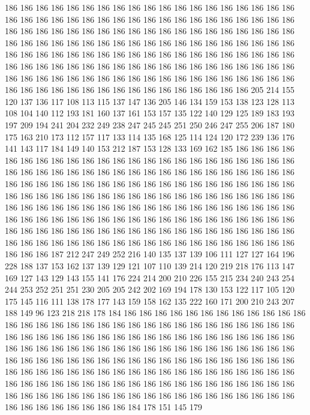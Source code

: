 186 186 186 186 186 186 186 186 186 186 186 186 186 186 186 186 186 186 186 186
186 186 186 186 186 186 186 186 186 186 186 186 186 186 186 186 186 186 186 186
186 186 186 186 186 186 186 186 186 186 186 186 186 186 186 186 186 186 186 186
186 186 186 186 186 186 186 186 186 186 186 186 186 186 186 186 186 186 186 186
186 186 186 186 186 186 186 186 186 186 186 186 186 186 186 186 186 186 186 186
186 186 186 186 186 186 186 186 186 186 186 186 186 186 186 186 186 186 186 186
186 186 186 186 186 186 186 186 186 186 186 186 186 186 186 186 186 186 186 186
186 186 186 186 186 186 186 186 186 205 214 155 120 137 136 117 108 113 115 137
147 136 205 146 134 159 153 138 123 128 113 108 104 140 112 193 181 160 137 161
153 157 135 122 140 129 125 189 183 193 197 209 194 241 204 232 249 238 247 245
245 251 250 246 247 255 206 187 180 175 163 210 173 112 157 117 133 114 135 168
125 114 124 120 172 239 136 176 141 143 117 184 149 140 153 212 187 153 128 133
169 162 185 186 186 186 186 186 186 186 186 186 186 186 186 186 186 186 186 186
186 186 186 186 186 186 186 186 186 186 186 186 186 186 186 186 186 186 186 186
186 186 186 186 186 186 186 186 186 186 186 186 186 186 186 186 186 186 186 186
186 186 186 186 186 186 186 186 186 186 186 186 186 186 186 186 186 186 186 186
186 186 186 186 186 186 186 186 186 186 186 186 186 186 186 186 186 186 186 186
186 186 186 186 186 186 186 186 186 186 186 186 186 186 186 186 186 186 186 186
186 186 186 186 186 186 186 186 186 186 186 186 186 186 186 186 186 186 186 186
186 186 186 186 186 186 186 186 186 186 186 186 186 186 186 186 186 186 186 186
186 186 187 212 247 249 252 216 140 135 137 139 106 111 127 127 164 196 228 188
137 153 162 137 139 129 121 107 110 139 214 120 219 218 176 113 147 169 127 143
129 143 155 141 176 224 214 200 210 226 155 215 234 240 243 254 244 253 252 251
251 230 205 205 242 202 169 194 178 130 153 122 117 105 120 175 145 116 111 138
178 177 143 159 158 162 135 222 160 171 200 210 243 207 188 149 96 123 218 218
178 184 186 186 186 186 186 186 186 186 186 186 186 186 186 186 186 186 186 186
186 186 186 186 186 186 186 186 186 186 186 186 186 186 186 186 186 186 186 186
186 186 186 186 186 186 186 186 186 186 186 186 186 186 186 186 186 186 186 186
186 186 186 186 186 186 186 186 186 186 186 186 186 186 186 186 186 186 186 186
186 186 186 186 186 186 186 186 186 186 186 186 186 186 186 186 186 186 186 186
186 186 186 186 186 186 186 186 186 186 186 186 186 186 186 186 186 186 186 186
186 186 186 186 186 186 186 186 186 186 186 186 186 186 186 186 186 186 186 186
186 186 186 186 186 186 186 186 186 186 186 186 186 186 186 184 178 151 145 179
